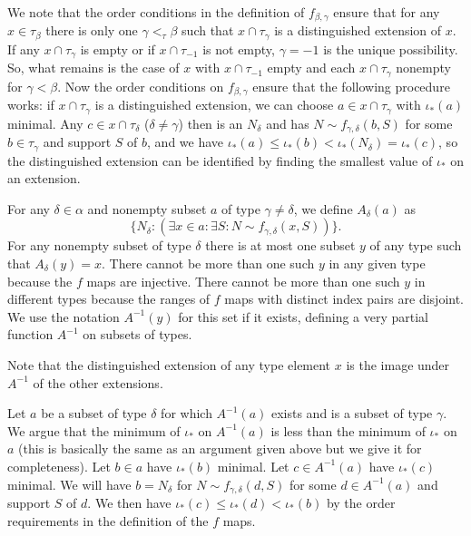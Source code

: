 \documentclass[112pt]{article}
\begin{document}
\begin{description}
We note that the order conditions in the definition of $f_{\beta,\gamma}$ ensure that for any $x \in \tau_\beta$ there is only one $\gamma <_\tau \beta$ such that $x \cap \tau_\gamma$ is a distinguished extension of $x$.  If any $x \cap \tau_\gamma$ is empty or if $x \cap \tau_{-1}$ is not empty, $\gamma= -1$ is the unique possibility.  So, what remains is the case of $x$ with $x \cap \tau_{-1}$ empty and each $x \cap \tau_\gamma$ nonempty for $\gamma<\beta$.
Now the order conditions on $f_{\beta,\gamma}$ ensure that the following procedure works:   if $x \cap \tau_\gamma$ is a distinguished extension,
we can choose $a \in x \cap \tau_\gamma$ with $\iota_*(a)$ minimal.  Any $c \in x \cap \tau_\delta$ ($\delta \neq \gamma$) then is an $N_\delta$ and
has $N \sim f_{\gamma,\delta}(b,S)$ for some $b \in \tau_\gamma$ and support $S$ of $b$, and we have $\iota_*(a) \leq \iota_*(b) < \iota_*(N_\delta) = \iota_*(c)$, so the distinguished extension can be identified by finding the smallest value of
$\iota_*$ on an extension.



For any $\delta \in \alpha$ and nonempty subset $a$ of type $\gamma \neq \delta$, we define $A_\delta(a)$ as $$\{N_\delta:(\exists x \in a:\exists S:N \sim f_{\gamma,\delta}(x,S))\}.$$  For any nonempty subset of type $\delta$ there is at most one subset $y$ of any type such that $A_\delta(y)=x$.  There cannot be more than one such $y$ in any given type because the $f$ maps are injective.  There cannot be more than one such $y$ in different types because the ranges of $f$ maps with distinct index pairs are disjoint.   We use the notation $A^{-1}(y)$ for this set if it exists, defining a very partial function $A^{-1}$ on subsets of types.

Note that the distinguished extension of any type element $x$ is the image under $A^{-1}$ of the other extensions.

Let $a$ be a subset of type $\delta$ for which $A^{-1}(a)$ exists and is a subset of type $\gamma$.  We argue that the minimum of $\iota_*$ on
$A^{-1}(a)$ is less than the minimum of $\iota_*$ on $a$ (this is basically the same as an argument given above but we give it for completeness).    Let $b \in a$ have $\iota_*(b)$ minimal.  Let $c \in A^{-1}(a)$ have $\iota_*(c)$ minimal.   We will have $b = N_\delta$ for $N \sim f_{\gamma,\delta}(d,S)$ for some $d \in A^{-1}(a)$ and support $S$ of $d$.  We then
have $\iota_*(c) \leq \iota_*(d) < \iota_*(b)$ by the order requirements in the definition of the $f$ maps.



\end{description}
\end{document}
